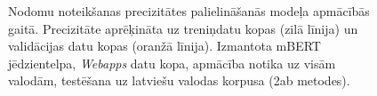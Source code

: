 \begin{figure}[h] 
   \centering
   \caption{Nodomu noteikšanas precizitātes palielināšanās modeļa apmācībās gaitā. Precizitāte aprēķināta uz treniņdatu kopas (zilā līnija) un validācijas datu kopas (oranžā līnija). Izmantota mBERT jēdzientelpa, \textit{Webapps} datu kopa, apmācība notika uz visām valodām, testēšana uz latviešu valodas korpusa (2ab metodes).} 
   \label{fig:webapps-bert-all}
\end{figure}


